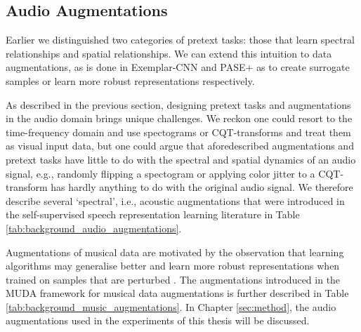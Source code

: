 \subsection{Audio Augmentations}\label{sec:audio_transformations}
Earlier we distinguished two categories of pretext tasks: those that learn spectral relationships and spatial relationships.
We can extend this intuition to data augmentations, as is done in Exemplar-CNN \cite{dosovitskiy_discriminative_2014} and PASE$+$ \cite{Ravanelli2020} as to create surrogate samples or learn more robust representations respectively.

As described in the previous section, designing pretext tasks and augmentations in the audio domain brings unique challenges.
We reckon one could resort to the time-frequency domain and use spectograms or CQT-transforms and treat them as visual input data, but one could argue that aforedescribed augmentations and pretext tasks have little to do with the spectral and spatial dynamics of an audio signal, e.g., randomly flipping a spectogram or applying color jitter to a CQT-transform has hardly anything to do with the original audio signal.
We therefore describe several `spectral', i.e., acoustic augmentations that were introduced in the self-supervised speech representation learning literature \cite{Ravanelli2020} in Table \ref{tab:background_audio_augmentations}.

Augmentations of musical data are motivated by the observation that learning algorithms may generalise better and learn more robust representations when trained on samples that are perturbed \cite{Sturm2015}.
The augmentations introduced in the MUDA framework for musical data augmentations is further described in Table \ref{tab:background_music_augmentations}.
In Chapter \ref{sec:method}, the audio augmentations used in the experiments of this thesis will be discussed.

